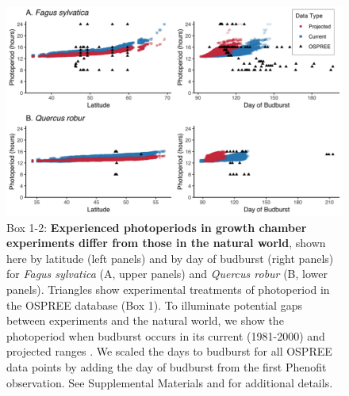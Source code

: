 \documentclass{article}
\begin{document}
\begin{figure}[h]
\includegraphics{..//..//analyses/photoperiod/figures/2D_actual_combined.png} 
\caption{Box 1-2: \textbf{Experienced photoperiods in growth chamber experiments differ from those in the natural world}, shown here by latitude (left panels) and by day of budburst (right panels) for \emph{Fagus sylvatica} (A, upper panels) and \emph{Quercus robur} (B, lower panels). Triangles show experimental treatments of photoperiod in the OSPREE database (Box 1). To illuminate potential gaps between experiments and the natural world, we show the photoperiod when budburst occurs in its current (1981-2000) and projected ranges \citep[2081-2100, using the A1Fi Phenofit scenario, see][]{duputie2015}. We scaled the days to budburst for all OSPREE data points by adding the day of budburst from the first Phenofit observation. See Supplemental Materials and \citet{duputie2015} for additional details.} 
 \label{fig:fagus}
 \end{figure}
 
 
\end{document}
